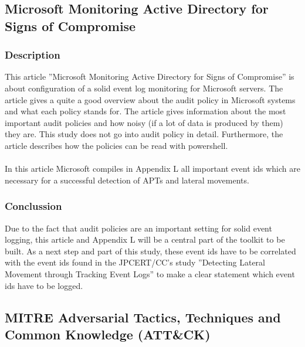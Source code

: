 \clearpage

\subsection{Microsoft Monitoring Active Directory for Signs of Compromise}
\subsubsection{Description}
This article ''Microsoft Monitoring Active Directory for Signs of Compromise'' \cite{MSADSignsOfCompromise} is about configuration of a solid event log monitoring for Microsoft servers. The article gives a quite a good overview about the audit policy in Microsoft systems and what each policy stands for. The article gives information about the most important audit policies and how noisy (if a lot of data is produced by them) they are. This study does not go into audit policy in detail. Furthermore, the article describes how the policies can be read with powershell.
\\\\
In this article Microsoft compiles in Appendix L \cite{MSAppendixL} all important event ids which are necessary for a successful detection of APTs and lateral movements.

\subsubsection{Conclussion}
Due to the fact that audit policies are an important setting for solid event logging, this article and Appendix L will be a central part of the toolkit to be built. As a next step and part of this study, these event ids have to be correlated with the event ids found in the JPCERT/CC's study ''Detecting Lateral Movement through Tracking Event Logs'' \cite{JPCERTDetectingLateralMovement} to make a clear statement which event ids have to be logged.

\subsection{MITRE Adversarial Tactics, Techniques and Common Knowledge (ATT\&CK)}
